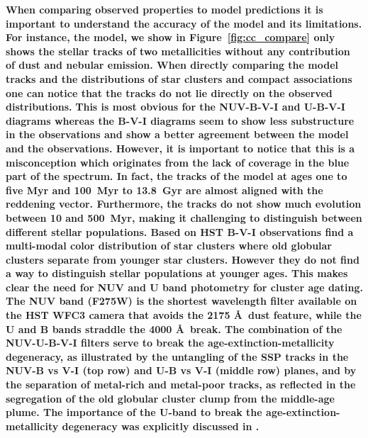 \textbf{When comparing observed properties to model predictions it is important to understand the accuracy of the model and its limitations. For instance, the  model, we show in Figure~\ref{fig:cc_compare} only shows the stellar tracks of two metallicities without any contribution of dust and nebular emission. 
When directly comparing the model tracks and the distributions of star clusters and compact associations one can notice that the tracks do not lie directly on the observed distributions.}
\textbf{
This is most obvious for the NUV-B-V-I and U-B-V-I diagrams whereas the B-V-I diagrams seem to show less substructure in the observations and show a better agreement between the model and the observations. However, it is important to notice that this is a misconception which originates from the lack of coverage in the blue part of the spectrum. In fact, the tracks of the  model at ages one to five Myr and 100~Myr to 13.8~Gyr are almost aligned with the reddening vector. Furthermore, the tracks do not show much evolution between 10 and 500~Myr, making it challenging to distinguish between different stellar populations. Based on HST B-V-I observations \citet{cantiello_star_2009} find a multi-modal color distribution of star clusters where old globular clusters separate from younger star clusters. However they do not find a way to distinguish stellar populations at younger ages.
This makes clear the need for NUV and U band photometry for cluster age dating. 
The NUV band (F275W) is the shortest wavelength filter available on the HST WFC3 camera that avoids the 2175 \AA\ dust feature, while the U and B bands straddle the 4000 \AA\ break.  The combination of the NUV-U-B-V-I filters serve to break the age-extinction-metallicity degeneracy, as illustrated by the untangling of the SSP tracks in the NUV-B vs V-I (top row) and U-B vs V-I (middle row) planes, and by the separation of metal-rich and metal-poor tracks, as reflected in the segregation of the old globular cluster clump from the middle-age plume. The importance of the U-band to break the age-extinction-metallicity degeneracy was explicitly discussed in \citet{smith_young_2007}.} 

